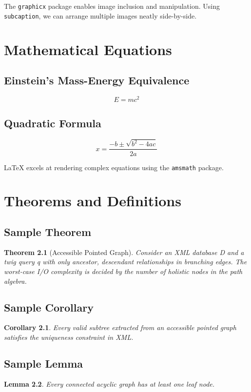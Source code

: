 \documentclass[12pt,a4paper]{report}
\newtheorem{theorem}{Theorem}[chapter]
\newtheorem{corollary}{Corollary}[theorem]
\newtheorem{lemma}[theorem]{Lemma}
\begin{document}
\justify
The \texttt{graphicx} package enables image inclusion and manipulation. Using \texttt{subcaption}, we can arrange multiple images neatly side-by-side.

\chapter{Mathematical Equations}
\section{Einstein's Mass-Energy Equivalence}
\begin{equation}
E = mc^2
\end{equation}

\section{Quadratic Formula}
\begin{equation}
x = \frac{-b \pm \sqrt{b^2 - 4ac}}{2a}
\end{equation}

\justify
LaTeX excels at rendering complex equations using the \texttt{amsmath} package.

\chapter{Theorems and Definitions}
\section{Sample Theorem}
\begin{theorem}[Accessible Pointed Graph]
\justify
Consider an XML database D and a twig query q with only ancestor, descendant relationships in branching edges. The worst-case I/O complexity is decided by the number of holistic nodes in the path algebra.
\end{theorem}

\section{Sample Corollary}
\begin{corollary}
Every valid subtree extracted from an accessible pointed graph satisfies the uniqueness constraint in XML.
\end{corollary}

\section{Sample Lemma}
\begin{lemma}
Every connected acyclic graph has at least one leaf node.
\end{lemma}
\end{document}
